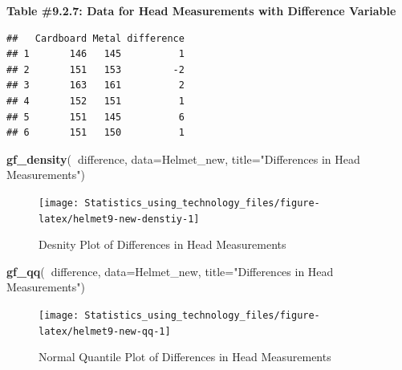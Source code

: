 \documentclass[
]{book}
\newenvironment{Shaded}{\begin{snugshade}}{\end{snugshade}}
\newcommand{\DataTypeTok}[1]{\textcolor[rgb]{0.13,0.29,0.53}{#1}}
\newcommand{\KeywordTok}[1]{\textcolor[rgb]{0.13,0.29,0.53}{\textbf{#1}}}
\newcommand{\NormalTok}[1]{#1}
\newcommand{\OperatorTok}[1]{\textcolor[rgb]{0.81,0.36,0.00}{\textbf{#1}}}
\newcommand{\StringTok}[1]{\textcolor[rgb]{0.31,0.60,0.02}{#1}}
\begin{document}
\textbf{Table \#9.2.7: Data for Head Measurements with Difference Variable}

\begin{Shaded}
\end{Shaded}

\begin{verbatim}
##   Cardboard Metal difference
## 1       146   145          1
## 2       151   153         -2
## 3       163   161          2
## 4       152   151          1
## 5       151   145          6
## 6       151   150          1
\end{verbatim}



\begin{Shaded}
\begin{Highlighting}[]
\KeywordTok{gf_density}\NormalTok{(}\OperatorTok{~}\NormalTok{difference, }\DataTypeTok{data=}\NormalTok{Helmet_new, }\DataTypeTok{title=}\StringTok{"Differences in Head Measurements"}\NormalTok{)}
\end{Highlighting}
\end{Shaded}

\begin{figure}
\texttt{[image: Statistics\_using\_technology\_files/figure-latex/helmet9-new-denstiy-1]} \caption{Desnity Plot of Differences in Head Measurements}\label{fig:helmet9-new-denstiy}
\end{figure}



\begin{Shaded}
\begin{Highlighting}[]
\KeywordTok{gf_qq}\NormalTok{(}\OperatorTok{~}\NormalTok{difference, }\DataTypeTok{data=}\NormalTok{Helmet_new, }\DataTypeTok{title=}\StringTok{"Differences in Head Measurements"}\NormalTok{)}
\end{Highlighting}
\end{Shaded}

\begin{figure}
\texttt{[image: Statistics\_using\_technology\_files/figure-latex/helmet9-new-qq-1]} \caption{Normal Quantile Plot of Differences in Head Measurements}\label{fig:helmet9-new-qq}
\end{figure}
\end{document}
